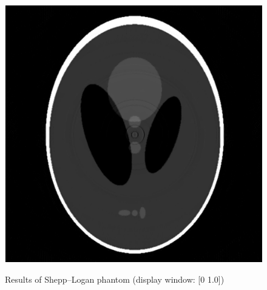\documentclass[hyperref]{ctexart}
\begin{document}
{\begin{figure}[htbp]
{					\includegraphics[scale=0.2]{RTV.png}
				}
				\quad
				\caption{Results of Shepp–Logan phantom (display window: [0 1.0])}
			\end{figure}
		
}
\end{document}
